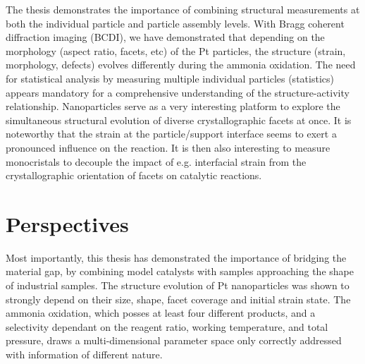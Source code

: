 
The thesis demonstrates the importance of combining structural measurements at both the individual particle and particle assembly levels.
With Bragg coherent diffraction imaging (BCDI), we have demonstrated that depending on the morphology (aspect ratio, facets, etc) of the Pt particles, the structure (strain, morphology, defects) evolves differently during the ammonia oxidation.
The need for statistical analysis by measuring multiple individual particles (statistics) appears mandatory for a comprehensive understanding of the structure-activity relationship.
Nanoparticles serve as a very interesting platform to explore the simultaneous structural evolution of diverse crystallographic facets at once.
It is noteworthy that the strain at the particle/support interface seems to exert a pronounced influence on the reaction.
It is then also interesting to measure monocristals to decouple the impact of e.g. interfacial strain from the crystallographic orientation of facets on catalytic reactions.

\section{Perspectives}


Most importantly, this thesis has demonstrated the importance of bridging the material gap, by combining model catalysts with samples approaching the shape of industrial samples.
The structure evolution of Pt nanoparticles was shown to strongly depend on their size, shape, facet coverage and initial strain state.
The ammonia oxidation, which posses at least four different products, and a selectivity dependant on the reagent ratio, working temperature, and total pressure, draws a multi-dimensional parameter space only correctly addressed with information of different nature.


